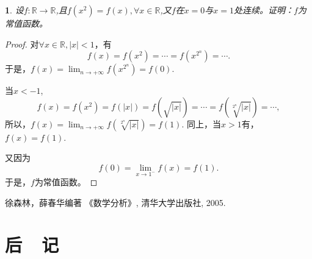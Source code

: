 \documentclass[utf8]{book}
\newtheorem{example}{}[section]             %
\begin{document}
\begin{example}
设$f:\mathbb{R}\rightarrow\mathbb{R}$,且$f(x^2)=f(x),\forall x\in\mathbb{R}$,又$f$在$x=0$与$x=1$处连续。证明：$f$为常值函数。
\end{example}
\begin{proof}对$\forall x\in\mathbb{R}, |x| < 1$，有
$$f(x) = f(x^2)=\cdots = f(x^{2^n})=\cdots.$$
于是，$f(x) = \displaystyle\lim_{n\to +\infty}f(x^{2^n}) = f(0)$.

当$x<-1$, $$f(x) = f(x^2) = f(|x|) = f(\sqrt{|x|})=\cdots =f(\sqrt[2^n]{|x|})=\cdots,$$
所以，$f(x) = \displaystyle\lim_{n\to +\infty}f(\sqrt[2^n]{|x|})=f(1)$.
同上，当$x > 1$有，$f(x) = f(1)$.

又因为
$$f(0) = \displaystyle\lim_{x\to 1^-}f(x)=f(1).$$
于是，$f$为常值函数。
\end{proof}









\appendix


\renewcommand\indexname{索~~引}
\printindex
{}

\backmatter


\begin{thebibliography}{参考文献}
 徐森林，薛春华编著 《数学分析》, 清华大学出版社, 2005.
\end{thebibliography}

\chapter{后~~记}

\begin{flushright}

\end{flushright}
\end{document}
